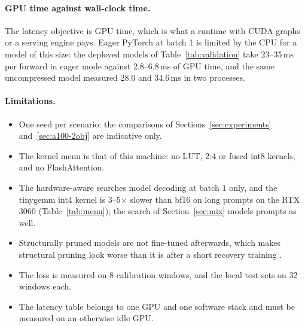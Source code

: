 \documentclass[11pt]{article}
\begin{document}
\paragraph{GPU time against wall-clock time.}
The latency objective is GPU time, which is what a runtime with CUDA graphs or a serving engine pays.
Eager PyTorch at batch 1 is limited by the CPU for a model of this size: the deployed models of
Table~\ref{tab:validation} take 23--35\,ms per forward in eager mode against 2.8--6.8\,ms of GPU time,
and the same uncompressed model measured 28.0 and 34.6\,ms in two processes.

\paragraph{Limitations.}
\begin{itemize}
  \item One seed per scenario: the comparisons of Sections~\ref{sec:experiments}
        and~\ref{sec:a100-2obj} are indicative only.
  \item The kernel menu is that of this machine: no LUT, 2:4 or fused int8 kernels, and no
        FlashAttention.
  \item The hardware-aware searches model decoding at batch 1 only, and the tinygemm int4 kernel is
        3--5$\times$ slower than bf16 on long prompts on the RTX 3060 (Table~\ref{tab:menu}); the search of
        Section~\ref{sec:mix} models prompts as well.
  \item Structurally pruned models are not fine-tuned afterwards, which makes structural pruning look
        worse than it is after a short recovery training \cite{ma2023llmpruner}.
  \item The loss is measured on 8 calibration windows, and the local test sets on 32 windows each.
  \item The latency table belongs to one GPU and one software stack and must be measured on an
        otherwise idle GPU.
\end{itemize}

\end{document}
